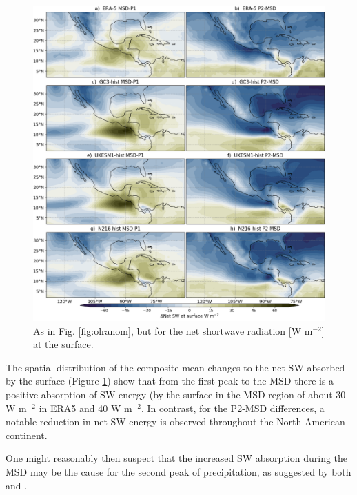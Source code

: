\begin{figure}[t!]
\includegraphics[width=\linewidth]{figures/fig4_netswdif_3.png}
\caption{As in Fig. \ref{fig:olranom}, but for the  net shortwave radiation [W m$^{-2}$] at the surface.}
\label{fig:swnet_diff}
\end{figure}

The spatial distribution of the composite mean changes to the net SW absorbed by the surface (Figure \ref{fig:swnet_diff}) show that from the first peak to the MSD there is a positive absorption of SW energy (by the surface in the MSD region of about 30 W m$^{-2}$ in ERA5 and 40 W m$^{-2}$. In contrast, for the P2-MSD differences, a notable reduction in net SW energy is observed throughout the North American continent.

One might reasonably then suspect that the increased SW absorption during the MSD may be the cause for the second peak of precipitation, as suggested by both \cite{magana1999} and \cite{karnauskas2013}. 

